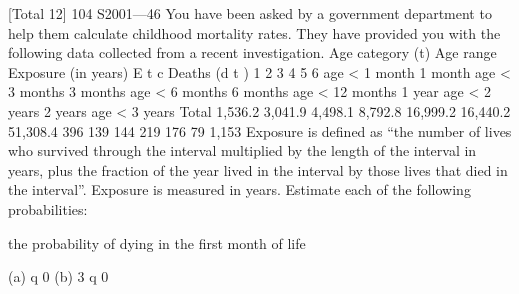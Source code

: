 \documentclass[a4paper,1pt]{article}
\begin{document}

[Total 12]
104 S2001—46
You have been asked by a government department to help them calculate
childhood mortality rates. They have provided you with the following data
collected from a recent investigation.
Age category
(t) Age range Exposure
(in years)
E t c Deaths
(d t )
1
2
3
4
5
6 age < 1 month
1 month \leq  age < 3 months
3 months \leq  age < 6 months
6 months \leq  age < 12 months
1 year \leq  age < 2 years
2 years \leq  age < 3 years
Total 1,536.2
3,041.9
4,498.1
8,792.8
16,999.2
16,440.2
51,308.4 396
139
144
219
176
79
1,153
Exposure is defined as “the number of lives who survived through the interval
multiplied by the length of the interval in years, plus the fraction of the year
lived in the interval by those lives that died in the interval”. Exposure is
measured in years.
Estimate each of the following probabilities:
\item  the probability of dying in the first month of life
\item  (a)
q 0
(b)
3 q 0
\end{document}
